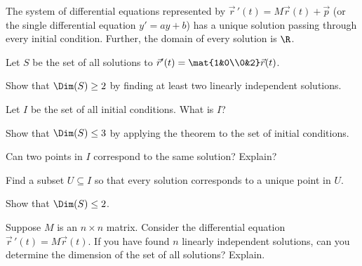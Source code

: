 \documentclass{workbook}
\begin{document}
\begin{slide}
	\question
	\begin{theorem}
		The system of differential equations represented by
		 $\vec r\,'(t) = M \vec r(t) + \vec p$ (or the single differential equation 
		 $y'=ay+b$) has a unique solution passing through every initial condition. Further, the domain of every
		solution is $\R$.
	\end{theorem}

	Let $S$ be the set of all solutions to $\vec r'(t) = \mat{1&0\\0&2}\vec r(t)$.

	\begin{parts}
		\item Show that $\Dim(S) \geq 2$ by finding at least two linearly independent solutions.
		\item Let $I$ be the set of all initial conditions. What is $I$?
		\item Show that $\Dim(S) \leq 3$ by applying the theorem to the set of initial conditions.
		\item Can two points in $I$ correspond to the same solution? Explain?
		\item Find a subset $U\subseteq I$ so that every solution corresponds to a unique point in $U$.
		\item Show that $\Dim(S) \leq 2$.
		\item Suppose $M$ is an $n\times n$ matrix. Consider the differential equation
		$\vec r\,'(t)=M\vec r(t)$. If you have found $n$ linearly
		independent solutions, can you determine the dimension of the set of all solutions?
		Explain. 
	\end{parts}
\end{slide}

%
%
\end{document}

